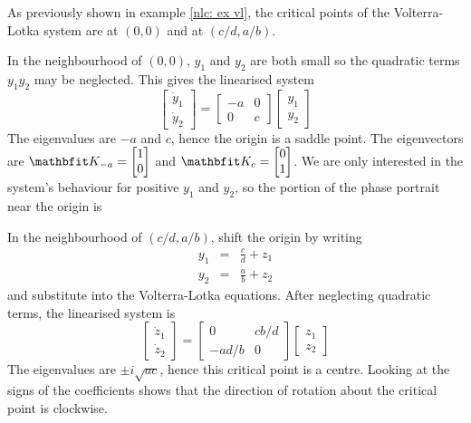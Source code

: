 \begin{example}

As previously shown in example \ref{nlc: ex vl}, the critical points of the 
Volterra-Lotka system are at $(0,0)$ and at $(c/d,a/b)$.

In the neighbourhood of $(0,0)$, $y_1$ and $y_2$ are both small so the
quadratic terms $y_1y_2$ may be neglected.  This gives the linearised system
$$\begin{bmatrix} \dot{y}_1 \\ \dot{y}_2 \end{bmatrix} = 
\begin{bmatrix} -a & 0 \\ 0 & c \end{bmatrix}
\begin{bmatrix} y_1 \\ y_2 \end{bmatrix} $$
The eigenvalues are $-a$ and $c$, hence the origin is a saddle point.  
The eigenvectors are 
$\vect{K}_{-a}=\begin{bmatrix} 1 \\ 0 \end{bmatrix}$ and
$\vect{K}_{c}=\begin{bmatrix} 0 \\ 1 \end{bmatrix}$.  
We are only interested in the system's behaviour for positive $y_1$ and $y_2$,
so the portion of the phase portrait near the origin is

\begin{center}
\end{center}

\noindent In the neighbourhood of $(c/d,a/b)$, shift the origin by writing
\begin{eqnarray*}
y_1&=&\frac{c}{d}+z_1\\
y_2&=&\frac{a}{b}+z_2
\end{eqnarray*}
and substitute into the Volterra-Lotka equations.  After neglecting
quadratic terms, the linearised system is
$$\begin{bmatrix} \dot{z}_1 \\ \dot{z}_2 \end{bmatrix} = 
\begin{bmatrix} 0 & cb/d \\ -ad/b & 0 \end{bmatrix}
\begin{bmatrix} z_1 \\ z_2 \end{bmatrix}$$
The eigenvalues are $\pm i\sqrt{ac}$, hence this critical point is a centre.
Looking at the signs of the coefficients shows that the direction of
rotation about the critical point is clockwise.


\end{example}
